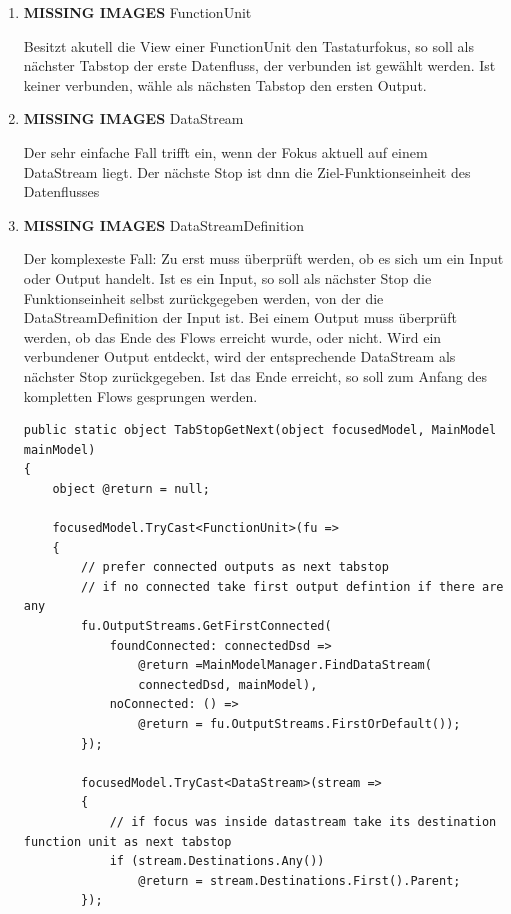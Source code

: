 \begin{enumerate}
	\item {\bfseries\sffamily MISSING IMAGES} FunctionUnit

	Besitzt akutell die View einer FunctionUnit den Tastaturfokus, so soll als
	nächster Tabstop der erste Datenfluss, der verbunden ist gewählt werden. Ist keiner
	verbunden, wähle als nächsten Tabstop den ersten Output.
	
	\item {\bfseries\sffamily MISSING IMAGES} DataStream

	Der sehr einfache Fall trifft ein, wenn der Fokus aktuell auf einem
	DataStream liegt. Der nächste Stop ist dnn die Ziel-Funktionseinheit des Datenflusses
	
	\item {\bfseries\sffamily MISSING IMAGES} DataStreamDefinition

	Der komplexeste Fall: 
	Zu erst muss überprüft werden, ob es sich um ein Input oder Output
	handelt. Ist es ein Input, so soll als nächster Stop die Funktionseinheit
	selbst zurückgegeben werden, von der die DataStreamDefinition der Input ist. 
	Bei einem Output muss überprüft werden, ob das Ende des Flows erreicht
	wurde, oder nicht. Wird ein verbundener Output entdeckt, wird der
	entsprechende DataStream als nächster Stop zurückgegeben. Ist das Ende
	erreicht, so soll zum Anfang des kompletten Flows gesprungen werden.
	
	\begin{lstlisting}[caption=Tabstop vorwärts]
public static object TabStopGetNext(object focusedModel, MainModel mainModel)
{
	object @return = null;
	
	focusedModel.TryCast<FunctionUnit>(fu =>
	{
		// prefer connected outputs as next tabstop
		// if no connected take first output defintion if there are any
		fu.OutputStreams.GetFirstConnected(
			foundConnected: connectedDsd => 
				@return =MainModelManager.FindDataStream(
				connectedDsd, mainModel),
			noConnected: () => 
				@return = fu.OutputStreams.FirstOrDefault());
		});
		
		focusedModel.TryCast<DataStream>(stream =>
		{
			// if focus was inside datastream take its destination function unit as next tabstop
			if (stream.Destinations.Any())
				@return = stream.Destinations.First().Parent;
		});
		

\end{lstlisting}
\end{enumerate}
